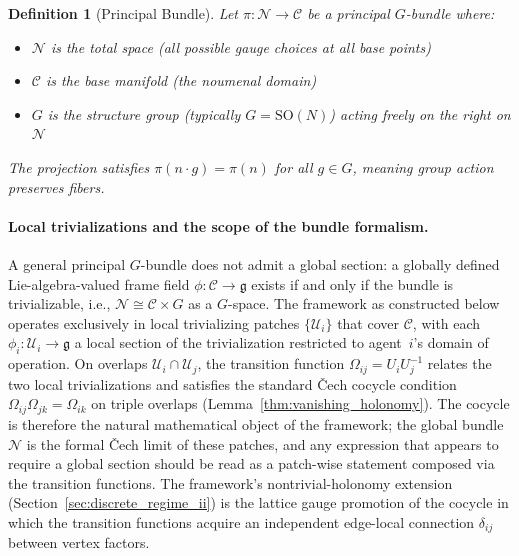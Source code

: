 \documentclass[11pt]{article}
\newtheorem{definition}{Definition}
\begin{document}
\begin{definition}[Principal Bundle]
Let $\pi: \mathcal{N} \to \mathcal{C}$ be a principal $G$-bundle where:
\begin{itemize}
\item $\mathcal{N}$ is the total space (all possible gauge choices at all base points)
\item $\mathcal{C}$ is the base manifold (the noumenal domain)
\item $G$ is the structure group (typically $G = \mathrm{SO}(N)$) acting freely on the right on $\mathcal{N}$
\end{itemize}
The projection satisfies $\pi(n \cdot g) = \pi(n)$ for all $g \in G$, meaning group action preserves fibers.
\end{definition}

\paragraph{Local trivializations and the scope of the bundle formalism.}
\label{sec:local_trivialization}
A general principal $G$-bundle does not admit a global section: a globally defined Lie-algebra-valued frame field $\phi: \mathcal{C} \to \mathfrak{g}$ exists if and only if the bundle is trivializable, i.e., $\mathcal{N} \cong \mathcal{C} \times G$ as a $G$-space. The framework as constructed below operates exclusively in local trivializing patches $\{\mathcal{U}_i\}$ that cover $\mathcal{C}$, with each $\phi_i: \mathcal{U}_i \to \mathfrak{g}$ a local section of the trivialization restricted to agent~$i$'s domain of operation. On overlaps $\mathcal{U}_i \cap \mathcal{U}_j$, the transition function $\Omega_{ij} = U_iU_j^{-1}$ relates the two local trivializations and satisfies the standard \v{C}ech cocycle condition $\Omega_{ij}\Omega_{jk} = \Omega_{ik}$ on triple overlaps (Lemma~\ref{thm:vanishing_holonomy}). The cocycle is therefore the natural mathematical object of the framework; the global bundle $\mathcal{N}$ is the formal \v{C}ech limit of these patches, and any expression that appears to require a global section should be read as a patch-wise statement composed via the transition functions. The framework's nontrivial-holonomy extension (Section~\ref{sec:discrete_regime_ii}) is the lattice gauge promotion of the cocycle in which the transition functions acquire an independent edge-local connection $\delta_{ij}$ between vertex factors.
\end{document}
